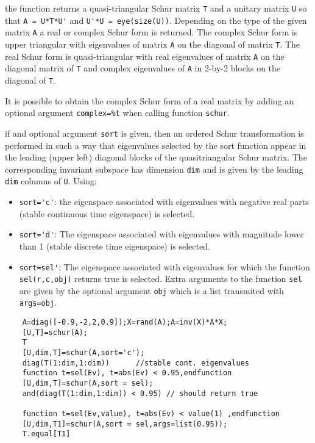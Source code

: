 \begin{mandescription}
   the function returns a quasi-triangular Schur matrix \verb!T! and 
   a unitary matrix \verb!U! so that \verb!A = U*T*U'! and 
   \verb!U'*U = eye(size(U))!. Depending on the type of the 
   given matrix \verb!A! a real or complex Schur form is returned. 
   The complex Schur form is  upper triangular with eigenvalues
   of matrix \verb!A! on the diagonal of matrix \verb!T!. The real 
   Schur form is quasi-triangular with real eigenvalues of matrix \verb!A! 
   on the diagonal matrix of \verb!T! and complex eigenvalues of 
    \verb!A! in 2-by-2 blocks on the diagonal of \verb!T!.

    It is possible to obtain the complex Schur form of a real matrix 
    by adding an optional argument \verb!complex=%t! when calling function
    \verb!schur!.

    if and optional argument \verb!sort! is given, then an ordered 
    Schur transformation is performed in such a way that eigenvalues 
    selected by the sort function appear in the leading (upper left) 
    diagonal blocks of the quasitriangular Schur matrix. The corresponding 
    invariant subspace has dimension \verb!dim! and is given by the 
    leading \verb!dim! columns of \verb!U!. Using:
    \begin{itemize}
      \item \verb!sort='c'!: the eigenspace associated with
      eigenvalues with negative real parts (stable continuous time eigenspace) is selected.
      \item \verb!sort='d'!: The eigenspace associated with
      eigenvalues with magnitude lower than 1 (stable discrete time eigenspace) is selected.
      \item \verb!sort=sel'!: The eigenspace associated with
      eigenvalues for which the function \verb!sel(r,c,obj)! returns true 
      is selected. Extra arguments to the function \verb!sel! are given 
      by the optional argument \verb!obj! which is a list transmited with \verb!args=obj!.
    \end{itemize}
\end{mandescription}
\begin{examples}
  \begin{Verbatim}
    A=diag([-0.9,-2,2,0.9]);X=rand(A);A=inv(X)*A*X;
    [U,T]=schur(A);
    T
    [U,dim,T]=schur(A,sort='c');
    diag(T(1:dim,1:dim))      //stable cont. eigenvalues
    function t=sel(Ev), t=abs(Ev) < 0.95,endfunction
    [U,dim,T]=schur(A,sort = sel);
    and(diag(T(1:dim,1:dim)) < 0.95) // should return true
    
    function t=sel(Ev,value), t=abs(Ev) < value(1) ,endfunction
    [U,dim,T1]=schur(A,sort = sel,args=list(0.95));
    T.equal[T1]
  \end{Verbatim}
\end{examples}
\begin{manseealso}
   
\end{manseealso}
